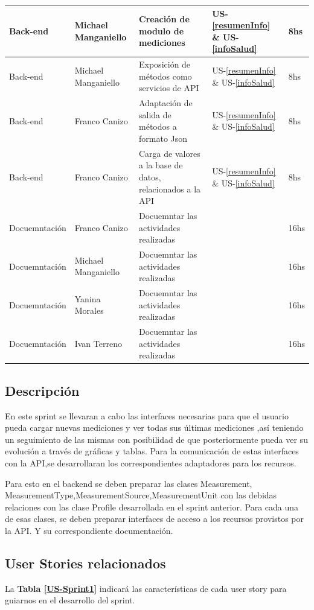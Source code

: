 \documentclass[a4paper,12pt]{article}
\begin{document}
{\begin{center}
{\begin{tabular}{|l|l|l|l|l|}
	    Back-end&Michael Manganiello  & Creación de modulo de mediciones&US-\ref{resumenInfo} \& US-\ref{infoSalud} &8hs\\ \hline
    	Back-end&Michael Manganiello  & Exposición de métodos como servicios de API 	& US-\ref{resumenInfo} \& US-\ref{infoSalud}&8hs\\ \hline
    	Back-end&Franco Canizo   & Adaptación de salida de métodos a formato Json&US-\ref{resumenInfo} \& US-\ref{infoSalud} &8hs\\ \hline
    	Back-end&Franco Canizo  & Carga de valores a la base de datos, relacionados a la API&US-\ref{resumenInfo} \& US-\ref{infoSalud} &8hs \\ \hline
    	Docuemntación&Franco Canizo  & Docuemntar las actividades realizadas& &16hs\\ \hline        
    	Docuemntación&Michael Manganiello  & Docuemntar las actividades realizadas& &16hs\\ \hline        
    	Docuemntación&Yanina Morales  & Docuemntar las actividades realizadas& &16hs\\ \hline        
    	Docuemntación&Ivan Terreno  & Docuemntar las actividades realizadas& &16hs\\ \hline                
	    \end{tabular}
        }
    	\end{center}
	}
    
    
\subsection{Descripción}
En este sprint se llevaran a cabo las interfaces necesarias para que el usuario pueda cargar nuevas mediciones y ver todas sus últimas mediciones ,así teniendo un seguimiento de las mismas con posibilidad de que posteriormente pueda ver su evolución a través de gráficas y tablas.
Para la comunicación de estas interfaces con la API,se desarrollaran los correspondientes adaptadores para los recursos.

Para esto en el backend se deben preparar las clases Measurement, MeasurementType,MeasurementSource,MeasurementUnit con las debidas relaciones con las clase Profile desarrollada en el sprint anterior.
Para cada una de esas clases, se deben preparar interfaces de acceso a los recursos provistos por la API. Y su correspondiente documentación.


\subsection{User Stories relacionados}
La \textbf{Tabla \ref{US-Sprint1}} indicará las características de cada user story para guiarnos en el desarrollo del sprint.
\end{document}
